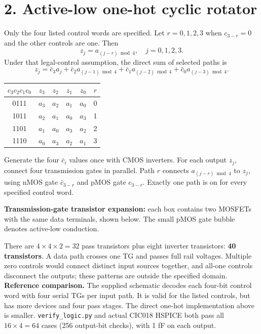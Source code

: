 \documentclass[11pt,a4paper]{article}
\newcommand{\MOS}[5]{
  \coordinate (#1) at (#2,#3);
  \coordinate (#1t) at ($(#1)+(0,.55)$);
  \coordinate (#1b) at ($(#1)+(0,-.55)$);
  \draw (#1t)--($(#1)+(0,.30)$)--($(#1)+(-.18,.30)$);
  \draw ($(#1)+(-.18,.34)$)--($(#1)+(-.18,-.34)$);
  \draw ($(#1)+(-.18,-.30)$)--($(#1)+(0,-.30)$)--(#1b);
  \draw ($(#1)+(-.35,.33)$)--($(#1)+(-.35,-.33)$);
  \def\type{#5}\def\ptype{p}
  \ifx\type\ptype
    \draw ($(#1)+(-.78,0)$)--($(#1)+(-.53,0)$);
    \draw ($(#1)+(-.465,0)$) circle (.065);
    \draw ($(#1)+(-.40,0)$)--($(#1)+(-.35,0)$);
  \else
    \draw ($(#1)+(-.78,0)$)--($(#1)+(-.35,0)$);
  \fi
  \node[anchor=east] at ($(#1)+(-.82,0)$) {$#4$};
  \node[anchor=west,font=\scriptsize] at ($(#1)+(.10,0)$) {#1};
}
\begin{document}
\section*{2. Active-low one-hot cyclic rotator}
Only the four listed control words are specified. Let $r=0,1,2,3$ when $c_{3-r}=0$ and the other controls are one. Then
\[
 \boxed{z_j=a_{(j-r)\bmod4}},\quad j=0,1,2,3.
\]
Under that legal-control assumption, the direct sum of selected paths is
\[
 z_j=\bar c_3a_j+\bar c_2a_{(j-1)\bmod4}
      +\bar c_1a_{(j-2)\bmod4}+\bar c_0a_{(j-3)\bmod4}.
\]
\begin{center}\begin{tabular}{c|cccc|c}\toprule
$c_3c_2c_1c_0$&$z_3$&$z_2$&$z_1$&$z_0$&$r$\\\midrule
0111&$a_3$&$a_2$&$a_1$&$a_0$&0\\
1011&$a_2$&$a_1$&$a_0$&$a_3$&1\\
1101&$a_1$&$a_0$&$a_3$&$a_2$&2\\
1110&$a_0$&$a_3$&$a_2$&$a_1$&3\\\bottomrule
\end{tabular}\end{center}
Generate the four $\bar c_i$ values once with CMOS inverters. For each output $z_j$, connect four transmission gates in parallel. Path $r$ connects $a_{(j-r)\bmod4}$ to $z_j$, using nMOS gate $\bar c_{3-r}$ and pMOS gate $c_{3-r}$. Exactly one path is on for every specified control word.
\begin{center}\end{center}
\textbf{Transmission-gate transistor expansion:} each box contains two MOSFETs with the same data terminals, shown below. The small pMOS gate bubble denotes active-low conduction.
\begin{center}\end{center}
There are $4\times4\times2=32$ pass transistors plus eight inverter transistors: \textbf{40 transistors}. A data path crosses one TG and passes full rail voltages. Multiple zero controls would connect distinct input sources together, and all-one controls disconnect the outputs; these patterns are outside the specified domain.
\textbf{Reference comparison.} The supplied schematic decodes each four-bit control word with four serial TGs per input path. It is valid for the listed controls, but has more devices and four pass stages. The direct one-hot implementation above is smaller. \texttt{verify\_logic.py} and actual CIC018 HSPICE both pass all $16\times4=64$ cases (256 output-bit checks), with 1 fF on each output.
\newpage
\end{document}

